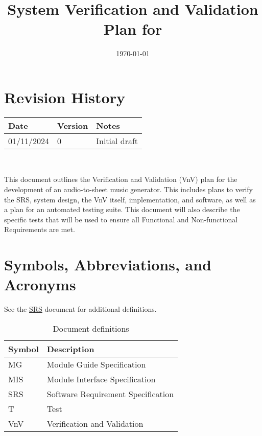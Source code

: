 \documentclass[12pt, titlepage]{article}
\begin{document}
\title{System Verification and Validation Plan for \progname{}} 
\author{\authname}
\date{\today}
	
\maketitle


\section*{Revision History}

\begin{tabularx}{\textwidth}{p{3cm}p{2cm}X}
\toprule {\bf Date} & {\bf Version} & {\bf Notes}\\
\midrule
01/11/2024 & 0 & Initial draft\\
\bottomrule
\end{tabularx}

~\\

\newpage

\tableofcontents

\listoftables

\newpage
{}

This document outlines the Verification and Validation (VnV) plan for the development 
of an audio-to-sheet music generator. This includes plans to verify the SRS, system 
design, the VnV itself, implementation, and software, as well as a plan for an automated 
testing suite. This document will also describe the specific tests that will be used to 
ensure all Functional and Non-functional Requirements are met.

\section{Symbols, Abbreviations, and Acronyms}
See the \href{https://github.com/emilyperica/ScoreGen/blob/main/docs/SRS-Volere/SRS.pdf}{SRS} document for additional definitions.

\renewcommand{\arraystretch}{1.2}
\begin{table}[h!]
  \centering
  \caption{Document definitions}
  \vspace{5pt}
  \begin{tabular}{l l}
    \toprule		
    \textbf{Symbol} & \textbf{Description}\\
    \midrule 
    MG & Module Guide Specification\\
    MIS & Module Interface Specification\\ 
    SRS & Software Requirement Specification\\
    T & Test\\
    VnV & Verification and Validation\\
    \bottomrule
  \end{tabular}
\end{table}
\end{document}
